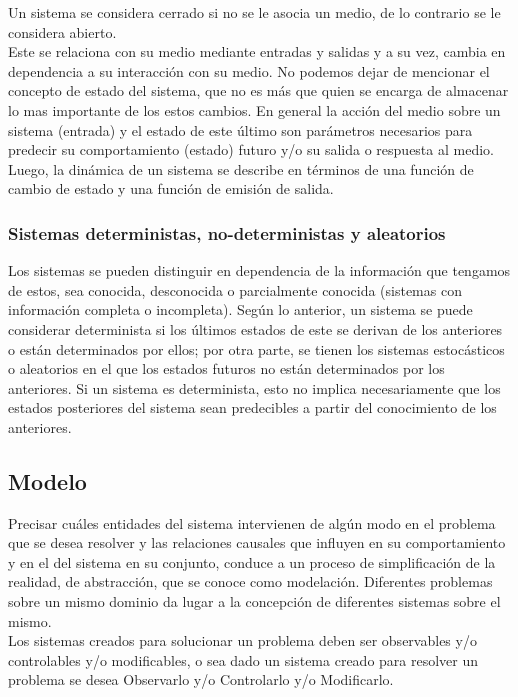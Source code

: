 Un sistema se considera cerrado si no se le asocia un medio, de lo contrario se le considera abierto. \parencite{temasdesimulacion}\\ Este se relaciona con su medio mediante entradas y salidas y a su vez, cambia en dependencia a su interacción con su medio.
No podemos dejar de mencionar el concepto de estado del sistema, que no es más que quien se encarga de almacenar lo mas importante de los estos cambios.
En general la acción del medio sobre un sistema (entrada) y el estado de este último son parámetros necesarios para predecir su comportamiento (estado) futuro y/o su salida o respuesta al medio. Luego, la dinámica de un sistema se describe en términos de una función de cambio de estado y una función de emisión de salida. \parencite{temasdesimulacion}\\

\subsubsection{Sistemas deterministas, no-deterministas y aleatorios}

Los sistemas se pueden distinguir en dependencia de la información que tengamos de estos, sea conocida, desconocida o parcialmente conocida (sistemas con información completa o incompleta).
Según lo anterior, un sistema se puede considerar determinista si los últimos estados de este se derivan de los anteriores o están determinados por ellos; por otra parte, se tienen los sistemas estocásticos o aleatorios en el que los estados futuros no están determinados por los anteriores.
Si un sistema es determinista, esto no implica necesariamente que los estados posteriores del sistema sean predecibles a partir del conocimiento de los anteriores. \parencite{darling_deterministic_nodate}

\subsection{Modelo}

Precisar cuáles entidades del sistema intervienen de algún modo en el problema que se desea resolver y las relaciones causales que influyen en su comportamiento y en el del sistema en su conjunto, conduce a un proceso de simplificación de la realidad, de abstracción, que se conoce como modelación.
Diferentes problemas sobre un mismo dominio da lugar a la concepción de diferentes sistemas sobre el mismo.\\

Los sistemas creados para solucionar un problema deben ser observables y/o controlables y/o modificables, o sea dado un sistema creado para resolver un problema se desea Observarlo y/o Controlarlo y/o Modificarlo. \parencite{temasdesimulacion}\\

